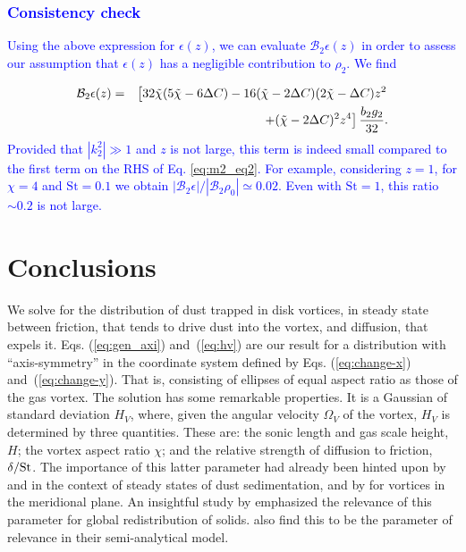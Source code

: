 \documentclass[apj]{emulateapj}
\def\blue#1{\textcolor{blue}{#1}}
\newcommand{\Eqs}[2]{Eqs. (\ref{#1}) and~(\ref{#2})}
\newcommand{\eqs}[2]{\Eqs{#1}{#2}}
\newcommand{\beqn}{\begin{eqnarray}}
\newcommand{\eeqn}{\end{eqnarray}}
\newcommand{\St}{{\rm St}}
\begin{document}
\blue{
\subsubsection{Consistency check}
Using the above expression for $\epsilon(z)$, we can evaluate
$\mathcal{B}_2\epsilon(z)$ in order to assess our assumption that
$\epsilon(z)$ has a negligible contribution to $\rho_2$. We find
}
\blue{
\beqn
\mathcal{B}_2\epsilon(z) =&& 
\left[32\tilde{\chi}(5\tilde{\chi} - 6\Delta C)-16(\tilde{\chi}-2\Delta C)(2\tilde{\chi}-\Delta C)z^2
\right.\notag\\&&\left.+(\tilde{\chi} - 2\Delta C)^2z^4\right]\frac{b_2g_2}{32}.
\eeqn
}
\blue{
Provided that $|k_2^2|\gg1$ and  $z$ is not large,  
this term is indeed small compared to the first term on the RHS of Eq. \ref{eq:m2_eq2}.  For example, considering $z=1$, 
for $\chi=4$ and $\mathrm{St}=0.1$ we obtain $|\mathcal{B}_2\epsilon|/|\mathcal{B}_2\rho_0|\simeq0.02$. 
Even with $\mathrm{St}=1$, this ratio $\sim0.2$ is not large. 
}

\section{Conclusions}

We solve for the distribution of dust trapped in
disk vortices, in steady state between friction, that 
tends to drive dust into the vortex, and diffusion, that expels
it. \eqs{eq:gen_axi}{eq:hv} are our result for a distribution with
``axis-symmetry''  in the coordinate system defined by
\eqs{eq:change-x}{eq:change-y}. That is, consisting of ellipses of
equal aspect ratio as those of the gas vortex. The solution has some remarkable
properties. It is a Gaussian of standard deviation $H_V$, where, given
the angular velocity $\varOmega_V$ of the vortex, $H_V$
is determined by three quantities. These are: 
the sonic length and gas scale height, $H$; the vortex aspect ratio
$\chi$; and the relative strength of diffusion to friction,
$\delta/\St$. The importance of this latter parameter had already been 
hinted upon by \citet{Cuzzi93} and \citet{Dubrulle95} 
in the context of steady states of dust sedimentation, and by
\citet{Klahr-Henning97} for vortices in the meridional plane. An insightful study by 
\citet{Jacquet12} emphasized the relevance of this parameter for 
global redistribution of solids. \citet{Birnstiel13} also find this to be 
the parameter of relevance in their semi-analytical model.
\end{document}
